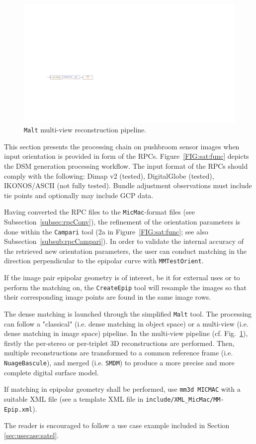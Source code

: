 %
\begin{figure}[h]
\centering 
\includegraphics[width=0.88\linewidth]{FIGS/Satellites/satFusion.pdf}
\caption{{\tt{Malt}} multi-view reconstruction pipeline. }\label{FIG:sat:fusion}
\end{figure}
%
This section presents the processing chain on pushbroom sensor images when input orientation is provided in form of the RPCs. Figure~\ref{FIG:sat:func} depicts the DSM generation processing workflow. The input format of the RPCs should comply with the following: Dimap v2 (tested), DigitalGlobe (tested), IKONOS/ASCII (not fully tested). Bundle adjustment observations must include tie points and optionally may include GCP data.\par  
%
Having converted the RPC files to the {\tt MicMac}-format files (see Subsection~\ref{subsec:rpcConv}), the refinement of the orientation parameters is done within the {\tt Campari} tool (2a in Figure~\ref{FIG:sat:func}; see also Subsection~\ref{subsub:rpcCampari}). In order to validate the internal accuracy of the retrieved new orientation parameters, the user can conduct matching in the direction perpendicular to the epipolar curve with {\tt MMTestOrient}.\par 
%
If the image pair epipolar geometry is of interest, be it for external uses or to perform the matching on, the {\tt CreateEpip} tool will resample the images so that their corresponding image points are found in the same image rows.\par 
%
The dense matching is launched through the simplified {\tt Malt} tool. The processing can follow a "classical" (i.e. dense matching in object space) or a multi-view (i.e. dense matching in image space) pipeline. In the multi-view pipeline (cf. Fig.~\ref{FIG:sat:fusion}), firstly the per-stereo or per-triplet 3D reconstructions are performed. Then, multiple reconstructions are transformed to a common reference frame (i.e. {\tt{NuageBascule}}), and merged (i.e. {\tt{SMDM}}) to produce a more precise and more complete digital surface model.\par
%
If matching in epipolar geometry shall be performed, use {\tt mm3d MICMAC} with a suitable XML file (see a template XML file in {\tt include/XML\_MicMac/MM-Epip.xml}).\par 
%
The reader is encouraged to follow a use case example included in Section~ \ref{sec:usecase:satel}. 

